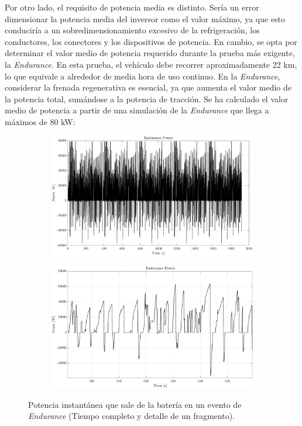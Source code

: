 Por otro lado, el requisito de potencia media es distinto. Sería un error dimensionar la potencia media del inversor como el valor máximo, ya que esto conduciría a un sobredimensionamiento excesivo de la refrigeración, los conductores, los conectores y los dispositivos de potencia. En cambio, se opta por determinar el valor medio de potencia requerido durante la prueba más exigente, la \textit{Endurance}. En esta prueba, el vehículo debe recorrer aproximadamente 22 km, lo que equivale a alrededor de media hora de uso continuo. En la \textit{Endurance}, considerar la frenada regenerativa es esencial, ya que aumenta el valor medio de la potencia total, sumándose a la potencia de tracción. Se ha calculado el valor medio de potencia a partir de una simulación de la \textit{Endurance} que llega a máximos de 80 kW:

\begin{figure}[H]
	\centering
	\begin{subfigure}[b]{0.45\textwidth}
		\centering
		\includegraphics[width=\textwidth]{fig/powerRMS}
	\end{subfigure}
	\hfill
	\begin{subfigure}[b]{0.45\textwidth}
		\centering
		\includegraphics[width=\textwidth]{fig/powerRMS-zoom}
	\end{subfigure}
	\caption{Potencia instantánea que sale de la batería en un evento de \textit{Endurance} (Tiempo completo y detalle de un fragmento).}
\end{figure}

